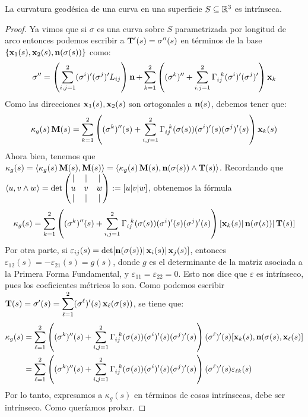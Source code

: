 \begin{prop}
La curvatura geodésica de una curva en una superficie $S\subseteq\mathbb{R}^3$ es intrínseca.
\begin{proof}
Ya vimos que si $\sigma$ es una curva sobre $S$ parametrizada por longitud de arco entonces podemos escribir a $\operatorname{\mathbf{T}}'(s)=\sigma''(s)$ en términos de la base $\{\operatorname{\mathbf{x}}_1(s),\operatorname{\mathbf{x}}_2(s),\operatorname{\mathbf{n}}(\sigma(s))\}$ como: $$\sigma''=\left(\displaystyle\sum_{i,j=1}^2 (\sigma^i)'(\sigma^j)'L_{ij}\right)\operatorname{\mathbf{n}} + \displaystyle\sum_{k=1}^2 \left((\sigma^k)'' + \displaystyle\sum_{i,j=1}^2 \Gamma_{ij}^{\;\;k}(\sigma^i)'(\sigma^j)'\right)\operatorname{\mathbf{x}}_k$$ Como las direcciones $\operatorname{\mathbf{x}}_1(s),\operatorname{\mathbf{x}}_2(s)$ son ortogonales a $\operatorname{\mathbf{n}}(s)$, debemos tener que: $$\kappa_g(s)\operatorname{\mathbf{M}}(s) = \displaystyle\sum_{k=1}^2\left( (\sigma^k)''(s) + \displaystyle\sum_{i,j=1}^2 \Gamma_{ij}^{\;\;k}(\sigma(s)) (\sigma^i)'(s)(\sigma^j)'(s)\right)\operatorname{\mathbf{x}}_k(s)$$ Ahora bien, tenemos que $\kappa_g(s)=\left\langle \kappa_g(s)\operatorname{\mathbf{M}}(s),\operatorname{\mathbf{M}}(s) \right\rangle = \left\langle \kappa_g(s)\operatorname{\mathbf{M}}(s),\operatorname{\mathbf{n}}(\sigma(s))\wedge\operatorname{\mathbf{T}}(s) \right\rangle$. Recordando que $\left\langle u,v\wedge w \right\rangle = \det\begin{pmatrix} | & | & | \\ u & v & w \\ | & | & | \end{pmatrix}:=[u|v|w]$, obtenemos la fórmula $$\kappa_g(s)=\displaystyle\sum_{k=1}^2 \left( (\sigma^k)''(s) + \displaystyle\sum_{i,j=1}^2 \Gamma_{ij}^{\;\;k}(\sigma(s)) (\sigma^i)'(s)(\sigma^j)'(s)\right) [\operatorname{\mathbf{x}}_k(s)|\operatorname{\mathbf{n}}(\sigma(s))|\operatorname{\mathbf{T}}(s)]$$
Por otra parte, si $\varepsilon_{ij}(s)=\det[\operatorname{\mathbf{n}}(\sigma(s))|\operatorname{\mathbf{x}}_i(s)|\operatorname{\mathbf{x}}_j(s)]$, entonces $\varepsilon_{12}(s)=-\varepsilon_{21}(s)=g(s)$, donde $g$ es el determinante de la matriz asociada a la Primera Forma Fundamental, y $\varepsilon_{11}=\varepsilon_{22}=0$. Esto nos dice que $\varepsilon$ es intrínseco, pues los coeficientes métricos lo son. Como podemos escribir $\operatorname{\mathbf{T}}(s)=\sigma'(s)=\displaystyle\sum_{\ell=1}^2 (\sigma^\ell)'(s)\operatorname{\mathbf{x}}_{\ell}(\sigma(s))$, se tiene que: \begin{align*}\kappa_g(s)&=\displaystyle\sum_{\ell=1}^2 \left((\sigma^k)''(s) + \displaystyle\sum_{i,j=1}^2 \Gamma_{ij}^{\;\;k}(\sigma(s)) (\sigma^i)'(s)(\sigma^j)'(s)\right)(\sigma^\ell)'(s)[\operatorname{\mathbf{x}}_k(s),\operatorname{\mathbf{n}}(\sigma(s),\operatorname{\mathbf{x}}_\ell(s)]\\&=\displaystyle\sum_{\ell=1}^2 \left((\sigma^k)''(s) + \displaystyle\sum_{i,j=1}^2 \Gamma_{ij}^{\;\;k}(\sigma(s)) (\sigma^i)'(s)(\sigma^j)'(s)\right)(\sigma^\ell)'(s)\varepsilon_{\ell k}(s)\end{align*} Por lo tanto, expresamos a $\kappa_g(s)$ en términos de cosas intrínsecas, debe ser intrínseco. Como queríamos probar.
\end{proof}
\end{prop}

